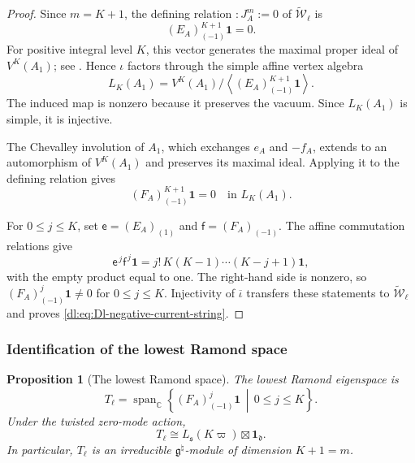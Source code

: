 \documentclass[11pt,reqno]{amsart}
\newtheorem{proposition}[theorem]{Proposition}
\theoremstyle{definition}
\theoremstyle{remark}
\begin{document}
\begin{proof}
Since \(m=K+1\), the defining relation
\(:J_A^m:=0\) of
\(\widetilde{\mathcal W}_\ell\) is
\begin{equation*}
  (E_A)_{(-1)}^{K+1}\mathbf1=0.
\end{equation*}
For positive integral level \(K\), this vector generates the maximal
proper ideal of \(V^K(A_1)\); see \cite{Kac1998}.  Hence
\(\iota\) factors through the simple affine vertex algebra
\[
  L_K(A_1)
  =
  V^K(A_1)/
  \left\langle
    (E_A)_{(-1)}^{K+1}\mathbf1
  \right\rangle.
\]
The induced map is nonzero because it preserves the vacuum.  Since
\(L_K(A_1)\) is simple, it is injective.

The Chevalley involution of \(A_1\), which exchanges \(e_A\) and
\(-f_A\), extends to an automorphism of \(V^K(A_1)\) and preserves its
maximal ideal.  Applying it to the defining relation gives
\begin{equation*}
  (F_A)_{(-1)}^{K+1}\mathbf1=0
  \quad\text{in }L_K(A_1).
\end{equation*}

For \(0\le j\le K\), set
\(
  \mathsf e=(E_A)_{(1)}
\)
and
\(
  \mathsf f=(F_A)_{(-1)}
\).
The affine commutation relations give
\begin{equation*}
  \mathsf e^{\,j}\mathsf f^{\,j}\mathbf1
  =
  j!\,K(K-1)\cdots(K-j+1)\mathbf1,
\end{equation*}
with the empty product equal to one.  The right-hand side is nonzero,
so \((F_A)_{(-1)}^j\mathbf1\ne0\) for \(0\le j\le K\).
Injectivity of \(\overline\iota\) transfers these statements to
\(\widetilde{\mathcal W}_\ell\) and proves
\eqref{dl:eq:Dl-negative-current-string}.
\end{proof}

\subsubsection{Identification of the lowest Ramond space}


\begin{proposition}[The lowest Ramond space]
\label{dl:prop:Dl-lowest-Ramond-space}
The lowest Ramond eigenspace is
\begin{equation}
  T_\ell
  =
  \operatorname{span}_{\mathbb C}
  \left\{
    (F_A)_{(-1)}^j\mathbf1
    \,\middle|\,
    0\le j\le K
  \right\}.
  \label{dl:eq:Dl-lowest-Ramond-space-basis}
\end{equation}
Under the twisted zero-mode action,
\begin{equation}
  T_\ell
  \cong
  L_{\mathfrak s}(K\varpi)
  \boxtimes
  \mathbf1_{\mathfrak d}.
  \label{dl:eq:Dl-lowest-Ramond-module-type}
\end{equation}
In particular, \(T_\ell\) is an irreducible
\(\mathfrak g^\natural\)-module of dimension \(K+1=m\).
\end{proposition}
\end{document}

